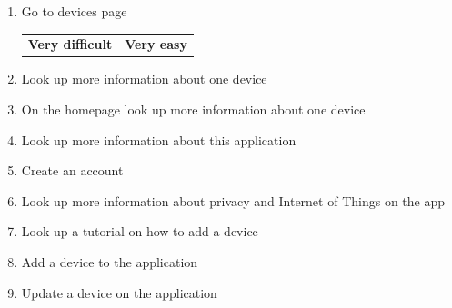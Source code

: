 \begin{enumerate}
    \item Go to devices page \\
    \hspace*{0.46\textwidth}%
    \begin{tabularx}{0.2\textwidth}{@{}LR@{}}
        \textbf{\small Very difficult} & \textbf{\small Very easy}
    \end{tabularx}
    \begin{enumerate}
    \end{enumerate}
    \item Look up more information about one device
    \begin{enumerate}
    \end{enumerate}
    \item On the homepage look up more information about one device
    \begin{enumerate}
    \end{enumerate}
    \item Look up more information about this application
    \begin{enumerate}
    \end{enumerate}
    \item Create an account
    \begin{enumerate}
    \end{enumerate}
    \item Look up more information about privacy and Internet of Things on the app
    \begin{enumerate}
    \end{enumerate}
    \item Look up a tutorial on how to add a device
    \begin{enumerate}
    \end{enumerate}
    \item Add a device to the application
    \begin{enumerate}
    \end{enumerate}
    \item Update a device on the application
    \begin{enumerate}
    \end{enumerate}
\end{enumerate}

